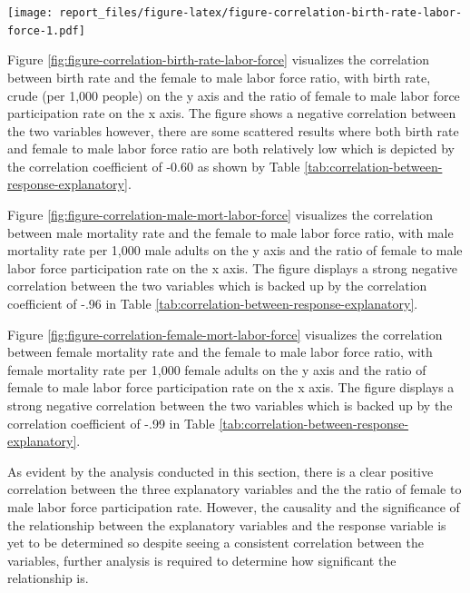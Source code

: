 \documentclass[11pt,a4paper,]{article}
\let\origfigure\figure
\let\endorigfigure\endfigure
\renewenvironment{figure}[1][2] {
    \expandafter\origfigure\expandafter[H]
} {
    \endorigfigure
}%
\begin{document}
\begin{figure}
\centering
\texttt{[image: report\_files/figure-latex/figure-correlation-birth-rate-labor-force-1.pdf]}
\caption{\label{fig:figure-correlation-birth-rate-labor-force}The figure
displays the relationship between the percentage results of birth rates
per 1000 adult females and the Ratio of female to male labor force
participation rate (\%) (national estimate)}
\end{figure}

Figure \ref{fig:figure-correlation-birth-rate-labor-force} visualizes
the correlation between birth rate and the female to male labor force
ratio, with birth rate, crude (per 1,000 people) on the y axis and the
ratio of female to male labor force participation rate on the x axis.
The figure shows a negative correlation between the two variables
however, there are some scattered results where both birth rate and
female to male labor force ratio are both relatively low which is
depicted by the correlation coefficient of -0.60 as shown by Table
\ref{tab:correlation-between-response-explanatory}.

Figure \ref{fig:figure-correlation-male-mort-labor-force} visualizes the
correlation between male mortality rate and the female to male labor
force ratio, with male mortality rate per 1,000 male adults on the y
axis and the ratio of female to male labor force participation rate on
the x axis. The figure displays a strong negative correlation between
the two variables which is backed up by the correlation coefficient of
-.96 in Table \ref{tab:correlation-between-response-explanatory}.

Figure \ref{fig:figure-correlation-female-mort-labor-force} visualizes
the correlation between female mortality rate and the female to male
labor force ratio, with female mortality rate per 1,000 female adults on
the y axis and the ratio of female to male labor force participation
rate on the x axis. The figure displays a strong negative correlation
between the two variables which is backed up by the correlation
coefficient of -.99 in Table
\ref{tab:correlation-between-response-explanatory}.

As evident by the analysis conducted in this section, there is a clear
positive correlation between the three explanatory variables and the the
ratio of female to male labor force participation rate. However, the
causality and the significance of the relationship between the
explanatory variables and the response variable is yet to be determined
so despite seeing a consistent correlation between the variables,
further analysis is required to determine how significant the
relationship is.
\end{document}
